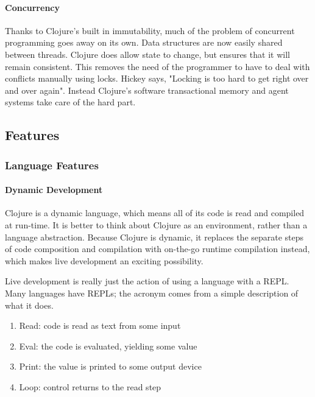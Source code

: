     \paragraph{Concurrency}
    Thanks to Clojure's built in immutability, much of the problem of concurrent programming goes away on its own. Data structures are now easily shared between threads. Clojure does allow state to change, but ensures that it will remain consistent. This removes the need of the programmer to have to deal with conflicts manually using locks. Hickey says, "Locking is too hard to get right over and over again". Instead Clojure's software transactional memory and agent systems take care of the hard part. \cite{clojure_website:rationale}
    
\subsection{Features}

\subsubsection{Language Features}

\paragraph{Dynamic Development}

    Clojure is a dynamic language, which means all of its code is read and compiled at run-time. It is better to think about Clojure as an environment, rather than a language abstraction. Because Clojure is dynamic, it replaces the separate steps of code composition and compilation with on-the-go runtime compilation instead, which makes live development an exciting possibility.
    
    Live development is really just the action of using a language with a REPL. Many languages have REPLs; the acronym comes from a simple description of what it does.
    \cite{ClojureProgramming_Book_EmerickCarperGrand}
    
    \begin{enumerate}
        \item Read: code is read as text from some input
        \item Eval: the code is evaluated, yielding some value
        \item Print: the value is printed to some output device
        \item Loop: control returns to the read step
    \end{enumerate}
    
